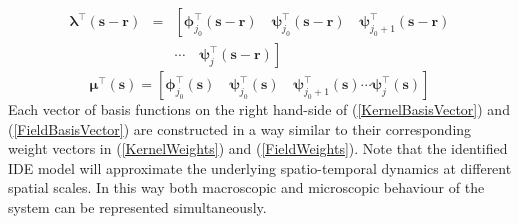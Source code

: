 \documentclass[11pt,draftcls,onecolumn,peerreview]{IEEEtran}
\begin{document}
\begin{eqnarray}
 \boldsymbol\lambda^\top(\mathbf s-\mathbf r)&=&\left[ \boldsymbol\phi_{j_0}^\top(\mathbf s-\mathbf r) \quad \boldsymbol\psi_{j_0}^\top(\mathbf s-\mathbf r) \quad \boldsymbol\psi_{j_0+1}^\top(\mathbf s-\mathbf r) \right. \nonumber \\
&&\left. \cdots \quad \boldsymbol\psi_{j}^\top(\mathbf s-\mathbf r)\right]
\label{KernelBasisVector} 
\end{eqnarray}
\begin{equation}
 \boldsymbol\mu^\top(\mathbf s)=\left[ \boldsymbol\phi_{j_0}^\top(\mathbf s) \quad \boldsymbol\psi_{j_0}^\top(\mathbf s) \quad \boldsymbol\psi_{j_0+1}^\top(\mathbf s) \cdots \boldsymbol\psi_{j}^\top(\mathbf s) \right] 
\label{FieldBasisVector}
\end{equation}
Each vector of basis functions on the right hand-side of (\ref{KernelBasisVector}) and (\ref{FieldBasisVector}) are constructed in a way similar to their corresponding weight vectors in (\ref{KernelWeights}) and (\ref{FieldWeights}). Note that the identified IDE model will approximate the underlying spatio-temporal dynamics at different spatial scales. In this way both macroscopic and microscopic behaviour of the system can be represented simultaneously. 

\end{document}
